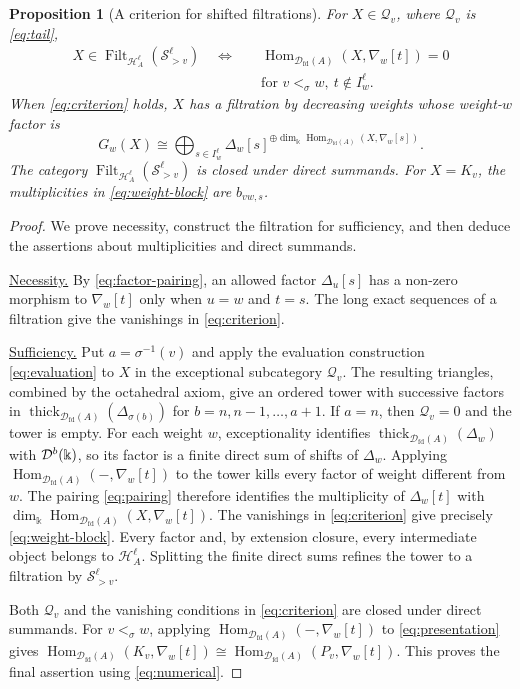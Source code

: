 \documentclass[11pt,a4paper]{article}
\newcommand{\D}{\mathcal D}
\renewcommand{\H}{\mathcal H}
\newcommand{\std}{\Delta}
\newcommand{\costd}{\nabla}
\DeclareMathOperator{\fd}{fd}
\DeclareMathOperator{\Hom}{Hom}
\DeclareMathOperator{\thick}{thick}
\DeclareMathOperator{\Filt}{Filt}
\let\mod\relax
\DeclareMathOperator{\mod}{mod}
\theoremstyle{plain}
\newtheorem{proposition}[theorem]{Proposition}
\theoremstyle{definition}
\numberwithin{equation}{section}
\begin{document}
\begin{proposition}[A criterion for shifted filtrations]\label{prop:criterion}
For $X\in\mathcal Q_v$, where $\mathcal Q_v$ is \eqref{eq:tail},
\begin{equation}\label{eq:criterion}
 \begin{split}
 X\in\Filt_{\H_A^\ell}(\mathcal S_{>v}^\ell)
 \quad\Longleftrightarrow\quad&
 \Hom_{\D_{\fd}(A)}(X,\costd_w[t])=0\\[-2pt]
 &\text{for }v<_\sigma w,\ t\notin I_w^\ell.
 \end{split}
\end{equation}
When \eqref{eq:criterion} holds, $X$ has a filtration by decreasing
weights whose weight-$w$ factor is
\begin{equation}\label{eq:weight-block}
 G_w(X)\cong
 \bigoplus_{s\in I_w^\ell}
 \std_w[s]^{\oplus\dim_{\Bbbk}
                    \Hom_{\D_{\fd}(A)}(X,\costd_w[s])}.
\end{equation}
The category $\Filt_{\H_A^\ell}(\mathcal S_{>v}^\ell)$ is closed under
direct summands. For $X=K_v$, the multiplicities in
\eqref{eq:weight-block} are $b_{vw,s}$.
\end{proposition}
\begin{proof}
We prove necessity, construct the filtration for sufficiency, and
then deduce the assertions about multiplicities and direct summands.

\noindent\underline{Necessity.}
By \eqref{eq:factor-pairing}, an allowed factor $\std_u[s]$ has a
non-zero morphism to $\costd_w[t]$ only when $u=w$ and $t=s$.
The long exact sequences of a filtration give the vanishings in
\eqref{eq:criterion}.

\noindent\underline{Sufficiency.}
Put $a=\sigma^{-1}(v)$ and apply the evaluation construction
\eqref{eq:evaluation} to $X$ in the exceptional subcategory
$\mathcal Q_v$. The resulting triangles, combined by the octahedral
axiom, give an ordered tower with successive factors in
$\thick_{\D_{\fd}(A)}(\std_{\sigma(b)})$
for $b=n,n-1,\ldots,a+1$. If $a=n$, then $\mathcal Q_v=0$ and the
tower is empty.
For each weight $w$, exceptionality identifies
$\thick_{\D_{\fd}(A)}(\std_w)$ with $\D^b(\mod\Bbbk)$, so its factor
is a finite direct sum of shifts of $\std_w$.
Applying $\Hom_{\D_{\fd}(A)}(-,\costd_w[t])$ to the tower kills every
factor of weight different from $w$. The pairing \eqref{eq:pairing}
therefore identifies the multiplicity of $\std_w[t]$ with
$\dim_{\Bbbk}\Hom_{\D_{\fd}(A)}(X,\costd_w[t])$.
The vanishings in \eqref{eq:criterion} give precisely
\eqref{eq:weight-block}. Every factor and, by extension closure, every
intermediate object belongs to $\H_A^\ell$.
Splitting the finite direct sums refines the tower to a filtration
by $\mathcal S_{>v}^\ell$.

Both $\mathcal Q_v$ and the vanishing conditions in
\eqref{eq:criterion} are closed under direct summands.
For $v<_\sigma w$, applying
$\Hom_{\D_{\fd}(A)}(-,\costd_w[t])$ to \eqref{eq:presentation} gives
$\Hom_{\D_{\fd}(A)}(K_v,\costd_w[t])
 \cong\Hom_{\D_{\fd}(A)}(P_v,\costd_w[t])$.
This proves the final assertion using \eqref{eq:numerical}.
\end{proof}
\end{document}
